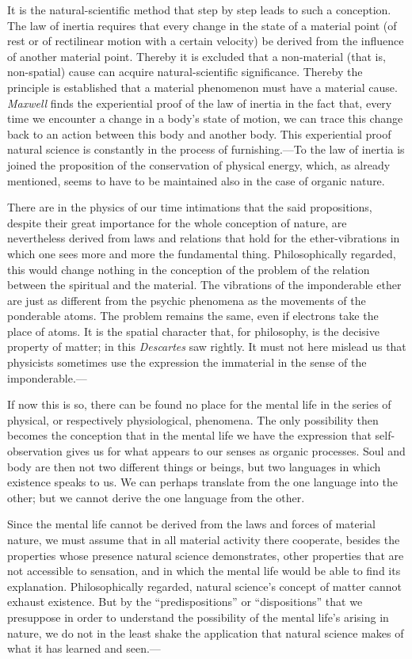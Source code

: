\documentclass[12pt,a4paper]{book}
\newcommand{\opage}[1]{\marginnote{\footnotesize\textit{[#1]}}}
\begin{document}
It is the natural-scientific method that step by step leads to such a
conception. The law of inertia requires that every change in the state
of a material point (of rest or of rectilinear motion with a certain
velocity) be derived from the influence of another material point.
Thereby it is excluded that a non-material (that is, non-spatial) cause
can acquire natural-scientific significance. Thereby the principle is
established that a material phenomenon must have a material cause.
\emph{Maxwell} finds the experiential proof of the law of inertia in the
fact that, every time we encounter a change in a body's state of motion,
we can trace this change back to an action between this body and another
body. This experiential proof natural science is constantly in the
process of furnishing.---To the law of inertia is joined the proposition
of the conservation of physical energy, which, as already mentioned,
seems to have to be maintained also in the case of organic nature.

There are in the physics of our time intimations that the said
propositions, despite their great importance for the whole conception of
nature, are nevertheless derived from laws and relations that hold for
the ether-vibrations in which one sees more and more the fundamental
thing. Philosophically regarded, this would change nothing in the
conception of the problem of the relation between the spiritual and the
material. The vibrations of the imponderable ether are just as different
from the psychic phenomena as the movements of the ponderable atoms. The
problem remains the same, even if electrons take the place of atoms. It
is the \opage{32}spatial character that, for philosophy, is the decisive property
of matter; in this \emph{Descartes} saw rightly. It must not here
mislead us that physicists sometimes use the expression the immaterial
in the sense of the imponderable.---

If now this is so, there can be found no place for the mental life in the
series of physical, or respectively physiological, phenomena. The only
possibility then becomes the conception that in the mental life we have
the expression that self-observation gives us for what appears to our
senses as organic processes. Soul and body are then not two different
things or beings, but two languages in which existence speaks to us. We
can perhaps translate from the one language into the other; but we cannot
derive the one language from the other.

Since the mental life cannot be derived from the laws and forces of
material nature, we must assume that in all material activity there
cooperate, besides the properties whose presence natural science
demonstrates, other properties that are not accessible to sensation, and
in which the mental life would be able to find its explanation.
Philosophically regarded, natural science's concept of matter cannot
exhaust existence. But by the ``predispositions'' or ``dispositions''
that we presuppose in order to understand the possibility of the mental
life's arising in nature, we do not in the least shake the application
that natural science makes of what it has learned and seen.---
\end{document}
